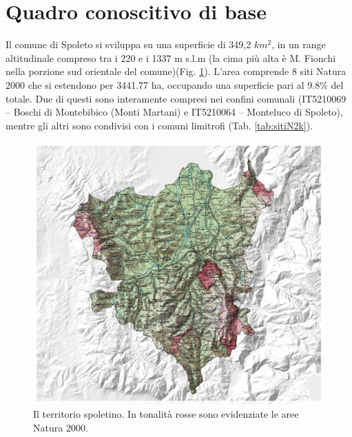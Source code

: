 \documentclass[
]{book}
\begin{document}
\section{Quadro conoscitivo di base}\label{quadro-conoscitivo-di-base}

Il comune di Spoleto si sviluppa su una superficie di 349,2 \(km^2\), in un range altitudinale compreso tra i 220 e i 1337 m s.l.m (la cima più alta è M. Fionchi nella porzione sud orientale del comune)(Fig. \ref{fig:cartaSpoleto}).
L'area comprende 8 siti Natura 2000 che si estendono per 3441.77 ha, occupando una superficie pari al 9.8\% del totale.
Due di questi sono interamente compresi nei confini comunali (IT5210069 -- Boschi di Montebibico (Monti Martani) e IT5210064 -- Monteluco di Spoleto), mentre gli altri sono condivisi con i comuni limitrofi (Tab. \ref{tab:sitiN2k}).

\begin{figure}

{\centering \includegraphics[width=\linewidth]{./figs/RECSpoleto_map01} 

}

\caption{Il territorio spoletino. In tonalità rosse sono evidenziate le aree Natura 2000.}\label{fig:cartaSpoleto}
\end{figure}
\end{document}
